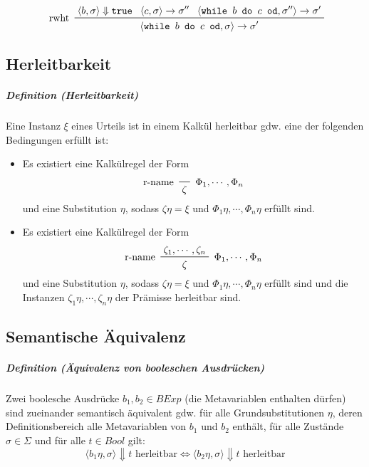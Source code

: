 \documentclass[a4paper, 11pt, accentcolor = tud3b]{tudreport}
\newcommand{\definition}[2]{\subparagraph{Definition (#1)} #2}
\begin{document}
				    \vspace{-0.4cm}
				    \begin{equation*}
					    \prftree[l]
						    { rwht }
						    { \langle b, \sigma \rangle \Downarrow \texttt{true} }
						    { \langle c, \sigma \rangle \rightarrow \sigma'' }
						    { \langle \texttt{while } b \texttt{ do } c \texttt{ od}, \sigma'' \rangle \rightarrow \sigma' }
						    { \langle \texttt{while } b \texttt{ do } c \texttt{ od}, \sigma \rangle \rightarrow \sigma' }
				    \end{equation*}
		    
		    \subsection{Herleitbarkeit}
				\definition{Herleitbarkeit}{
					Eine Instanz $ \xi $ eines Urteils ist in einem Kalkül herleitbar gdw. eine der folgenden Bedingungen erfüllt ist:
					\begin{itemize}
						\item Es existiert eine Kalkülregel der Form
							\begin{equation*}
								\prftree[l, r]
									{ $ \Phi _ 1, \cdots, \Phi _ n $ }
									{ r-name }
									{ \zeta }
							\end{equation*}
							und eine Substitution $ \eta $, sodass $ \zeta\eta = \xi $ und $ \Phi _ 1 \eta, \cdots, \Phi _ n \eta $ erfüllt sind.
						\item Es existiert eine Kalkülregel der Form
							\begin{equation*}
								\prftree[l, r]
									{ $ \Phi _ 1, \cdots, \Phi _ n $ }
									{ r-name }
									{ \zeta _ 1, \cdots, \zeta _ n }
									{ \zeta }
							\end{equation*}
							und eine Substitution $ \eta $, sodass $ \zeta\eta = \xi $ und $ \Phi _ 1 \eta, \cdots, \Phi _ n \eta $ erfüllt sind und die Instanzen $ \zeta _ 1 \eta, \cdots, \zeta _ n \eta $ der Prämisse herleitbar sind.
					\end{itemize}
				}
		    
		    \subsection{Semantische Äquivalenz}
			    \definition{Äquivalenz von booleschen Ausdrücken}{
				    Zwei boolesche Ausdrücke $ b _ 1, b _ 2 \in \textit{BExp} $ (die Metavariablen enthalten dürfen) sind zueinander semantisch äquivalent gdw. für alle Grundsubstitutionen $ \eta $, deren Definitionsbereich alle Metavariablen von $ b _ 1 $ und $ b _ 2 $ enthält, für alle Zustände $ \sigma \in \Sigma $ und für alle $ t \in \textit{Bool} $ gilt:
				    \begin{equation*}
					    \langle b _ 1 \eta, \sigma \rangle \Downarrow t \text{ herleitbar} \iff \langle b _ 2 \eta, \sigma \rangle \Downarrow t \text{ herleitbar}
				    \end{equation*}
			    }
			    
\end{document}
